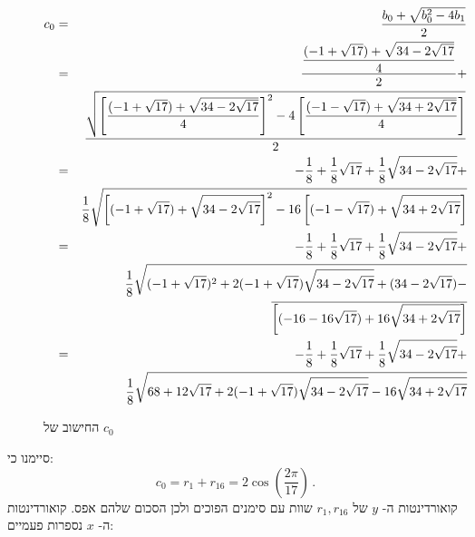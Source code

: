 \begin{figure}

\begin{eqnarray*}
c_0&=&\displaystyle\frac{b_0+\sqrt{b_0^2-4b_1}}{2}\\
&=&\displaystyle\frac{
     \displaystyle\frac{
     (-1+\sqrt{17}) +
     \sqrt{34-2\sqrt{17}}
   }{4}}{2} + \\
&& 
    \displaystyle\frac{
       \sqrt{\left[\displaystyle\frac{
     (-1+\sqrt{17}) + 
     \sqrt{34-2\sqrt{17}}
   }{4}\right]^2-4\left[\displaystyle\frac{
     (-1-\sqrt{17}) + 
     \sqrt{34+2\sqrt{17}}
   }{4}\right]}
   }{2}\\
&=&-\displaystyle\frac{1}{8}+\displaystyle\frac{1}{8}\sqrt{17} + 
     \displaystyle\frac{1}{8}\sqrt{34-2\sqrt{17}}
    + \\
   &&
     \displaystyle\frac{1}{8}\sqrt{
     \left[
     (-1+\sqrt{17}) + 
     \sqrt{34-2\sqrt{17}}
   \right]^2-16\left[
     (-1-\sqrt{17}) + 
     \sqrt{34+2\sqrt{17}}
   \right]}
\\
&=&-\displaystyle\frac{1}{8}+\displaystyle\frac{1}{8}\sqrt{17} + 
     \displaystyle\frac{1}{8}\sqrt{34-2\sqrt{17}}
    + \\
   &&
     \displaystyle\frac{1}{8}\sqrt{
     (-1+\sqrt{17})^2 + 
     2(-1+\sqrt{17})\sqrt{34-2\sqrt{17}}+
     (34-2\sqrt{17})
   -}\\
   &&\overline{
     \left[(-16-16\sqrt{17}) + 
     16\sqrt{34+2\sqrt{17}}\right]
   }
\\
&=&-\displaystyle\frac{1}{8}+\displaystyle\frac{1}{8}\sqrt{17} + 
     \displaystyle\frac{1}{8}\sqrt{34-2\sqrt{17}}
    + \\
   &&
     \displaystyle\frac{1}{8}\sqrt{
     68+12\sqrt{17} + 
     2(-1+\sqrt{17})\sqrt{34-2\sqrt{17}}
   -16
     \sqrt{34+2\sqrt{17}}
   }
\end{eqnarray*}
\caption{החישוב של $c_0$}\label{fig.c0}
\end{figure}

\clearpage

סיימנו כי:
\[
c_0=r_1+r_{16}=2\cos\left(\frac{2\pi}{17}\right)\,.
\]
קואורדינטות ה-%
$y$
של
$r_1,r_{16}$
שוות עם סימנים הפוכים ולכן הסכום שלהם אפס. קואורדינטות ה-%
$x$
נספרות פעמיים:
\begin{center}

\end{center}


